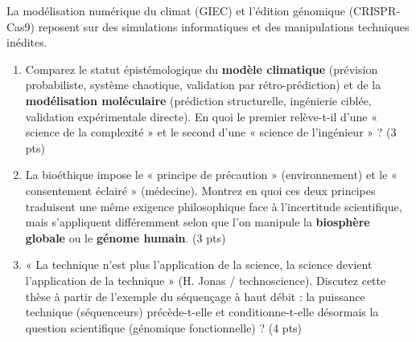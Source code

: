 \documentclass[11pt]{article}
\begin{document}
\begin{exercice}
La modélisation numérique du climat (GIEC) et l'édition génomique (CRISPR-Cas9) reposent sur des simulations informatiques et des manipulations techniques inédites.
\begin{enumerate}
    \item Comparez le statut épistémologique du \textbf{modèle climatique} (prévision probabiliste, système chaotique, validation par rétro-prédiction) et de la \textbf{modélisation moléculaire} (prédiction structurelle, ingénierie ciblée, validation expérimentale directe). En quoi le premier relève-t-il d'une « science de la complexité » et le second d'une « science de l'ingénieur » ? \hfill (3 pts)
    \item La bioéthique impose le « principe de précaution » (environnement) et le « consentement éclairé » (médecine). Montrez en quoi ces deux principes traduisent une même exigence philosophique face à l'incertitude scientifique, mais s'appliquent différemment selon que l'on manipule la \textbf{biosphère globale} ou le \textbf{génome humain}. \hfill (3 pts)
    \item « La technique n'est plus l'application de la science, la science devient l'application de la technique » (H. Jonas / technoscience). Discutez cette thèse à partir de l'exemple du séquençage à haut débit : la puissance technique (séquenceurs) précède-t-elle et conditionne-t-elle désormais la question scientifique (génomique fonctionnelle) ? \hfill (4 pts)
\end{enumerate}
\end{exercice}
\end{document}
